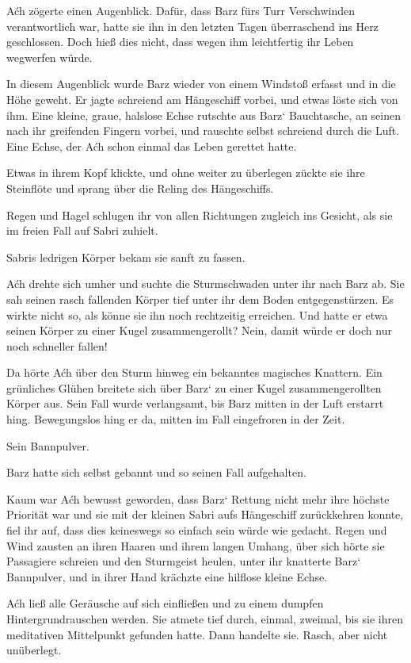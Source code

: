 Aćh zögerte einen Augenblick. Dafür, dass Barz fürs Turr Verschwinden verantwortlich war, hatte sie ihn in den letzten Tagen überraschend ins Herz geschlossen. Doch hieß dies nicht, dass wegen ihm leichtfertig ihr Leben wegwerfen würde.

In diesem Augenblick wurde Barz wieder von einem Windstoß erfasst und in die Höhe geweht. Er jagte schreiend am Hängeschiff vorbei, und etwas löste sich von ihm. Eine kleine, graue, halslose Echse rutschte aus Barz‘ Bauchtasche, an seinen nach ihr greifenden Fingern vorbei, und rauschte selbst schreiend durch die Luft. Eine Echse, der Aćh schon einmal das Leben gerettet hatte.

Etwas in ihrem Kopf klickte, und ohne weiter zu überlegen zückte sie ihre Steinflöte und sprang über die Reling des Hängeschiffs.

Regen und Hagel schlugen ihr von allen Richtungen zugleich ins Gesicht, als sie im freien Fall auf Sabri zuhielt.

Sabris ledrigen Körper bekam sie sanft zu fassen.

Aćh drehte sich umher und suchte die Sturmschwaden unter ihr nach Barz ab. Sie sah seinen rasch fallenden Körper tief unter ihr dem Boden entgegenstürzen. Es wirkte nicht so, als könne sie ihn noch rechtzeitig erreichen. Und hatte er etwa seinen Körper zu einer Kugel zusammengerollt? Nein, damit würde er doch nur noch schneller fallen!

Da hörte Aćh über den Sturm hinweg ein bekanntes magisches Knattern. Ein grünliches Glühen breitete sich über Barz‘ zu einer Kugel zusammengerollten Körper aus. Sein Fall wurde verlangsamt, bis Barz mitten in der Luft erstarrt hing. Bewegungslos hing er da, mitten im Fall eingefroren in der Zeit.

Sein Bannpulver.

Barz hatte sich selbst gebannt und so seinen Fall aufgehalten.

Kaum war Aćh bewusst geworden, dass Barz‘ Rettung nicht mehr ihre höchste Priorität war und sie mit der kleinen Sabri aufs Hängeschiff zurückkehren konnte, fiel ihr auf, dass dies keineswegs so einfach sein würde wie gedacht. Regen und Wind zausten an ihren Haaren und ihrem langen Umhang, über sich hörte sie Passagiere schreien und den Sturmgeist heulen, unter ihr knatterte Barz‘ Bannpulver, und in ihrer Hand krächzte eine hilflose kleine Echse.

Aćh ließ alle Geräusche auf sich einfließen und zu einem dumpfen Hintergrundrauschen werden. Sie atmete tief durch, einmal, zweimal, bis sie ihren meditativen Mittelpunkt gefunden hatte. Dann handelte sie. Rasch, aber nicht unüberlegt.

